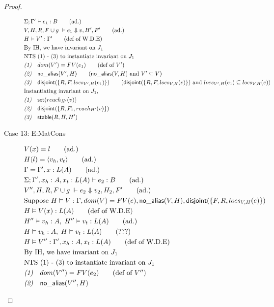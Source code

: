 \documentclass[11pt]{article}
\newcommand{\ms}[1]{\ensuremath{\mathsf{#1}}}
\newcommand{\na}[1]{\mathsf{no\_alias}(#1)}
\newcommand{\stable}[1]{\mathsf{stable}(#1)}
\newcommand{\dist}[1]{\mathsf{disjoint}(#1)}
\theoremstyle{definition}
\begin{document}
\begin{proof}
\begin{description}
\begin{align*}
  &\Sigma; \Gamma' \vdash e_1 : B \tag{ad.}\\
  &V,H,R,F \cup g \; \vdash e_1 \Downarrow v, H',F' \tag{ad.}\\
  &H \vDash V' : \Gamma' \tag{def of W.D.E}\\
  &\text{By IH, we have invariant on } J_1\\
  &\text{NTS (1) - (3) to instantiate invariant on } J_1\\
  &\emph{(1)}\quad dom(V') = FV(e_1) \tag{def of $V'$}\\
  &\emph{(2)}\quad \na{V',H} \tag{$\na{V,H}$ and $V' \subseteq V$}\\
  &\emph{(3)}\quad \dist{\{R,F,locs_{V',H}(e_1)\}} \tag{$\dist{\{R,F,locs_{V,H}(e)\}}$ and $locs_{V',H}(e_1) \subseteq locs_{V,H}(e)$}\\
  &\text{Instantiating invariant on } J_1,\\
  &\emph{(1)}\quad \ms{set}(reach_{H'}(v))\\
  &\emph{(2)}\quad \dist{\{R,F_1,reach_{H'}(v)\}}\\
  &\emph{(3)}\quad \stable{R,H,H'}
  \end{align*}
  \item [Case 13: E:MatCons]
  \begin{align*}
  &V(x) = l \tag{ad.}\\
  &H(l) = \pairexcst{v_h}{v_t} \tag{ad.}\\
  &\Gamma = \Gamma', x : L(A) \tag{ad.}\\
  &\Sigma; \Gamma', x_h : A, x_t : L(A) \vdash e_2 : B \tag{ad.}\\
  &V'',H,R,F \cup g \; \vdash e_2 \Downarrow v_2, H_2, F' \tag{ad.} \\
  &\text{Suppose } H \vDash V : \Gamma, dom(V) = FV(e), \na{V,H},\dist{\{F,R,locs_{V,H}(e)\}}\\
  &H \vDash V(x) : L(A) \tag{def of W.D.E}\\
  &H''\vDash v_h : A,\; H'' \vDash v_t : L(A) \tag{ad.}\\
  &H\vDash v_h : A,\; H \vDash v_t : L(A) \tag{???}\\
  &H \vDash V'' : \Gamma', x_h : A, x_t : L(A) \tag{def of W.D.E}\\
  &\text{By IH, we have invariant on } J_1\\
  &\text{NTS (1) - (3) to instantiate invariant on } J_1\\
  &\emph{(1)}\quad dom(V'') = FV(e_2) \tag{def of $V''$}\\
  &\emph{(2)}\quad \na{V'',H} \\

\end{align*}
\end{description}
\end{proof}
\end{document}
